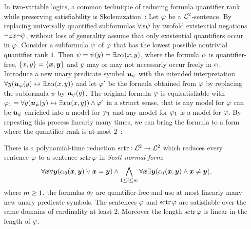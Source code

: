 In two-variable logics, a common technique of reducing formula quantifier rank
while preserving satisfiability is Skolemization~\cite{gradel1999logics}:
Let $\varphi$ be a $\mathcal{L}^{2}$-sentence.
By replacing universally quantified subformulas $\forall x \psi$ by twofold
existential negations $\lnot\exists x \lnot\psi$, without loss of generality
assume that only existential quantifiers occur in $\varphi$.
Consider a subformula $\psi$ of $\varphi$ that has the lowest possible nontrivial
quantifier rank $1$.
Then $\psi = \psi(y) = \exists x \alpha(x,y)$, where the formula
$\alpha$ is quantifier-free, $\left\{x,y\right\} = \left\{\bm{x},\bm{y}\right\}$ and $y$ may
or may not necessarly occur freely in $\alpha$.
Introduce a new unary predicate symbol $\bm{u}_{\psi}$ with the intended
interpretation $\forall y(\bm{u}_{\psi}(y) \leftrightarrow \exists x \alpha(x,y))$ and
let ${\varphi'}$ be the formula obtained from $\varphi$ by replacing the subformula
$\psi$ by $\bm{u}_{\psi}(y)$.
The original formula $\varphi$ is equisatisfiable with
$\varphi_1 = \forall y(\bm{u}_{\psi}(y) \leftrightarrow \exists x \alpha(x,y)) \land
{\varphi'}$ in a strinct sense, that is any model for $\varphi$ can be
$\bm{u}_{\psi}$-enriched into a model for $\varphi_1$ and any model for $\varphi_1$ is a
model for $\varphi$.
By repeating this process linearly many times, we can bring the formula to a
form where the quantifier rank is at most 
$2$~\cite{scott1962decision,gradel1999logics}:
\begin{theorem}[Scott]
There is a polynomial-time reduction $\operatorname{sctr}: \mathcal{L}^{2} \to \mathcal{L}^{2}$ which reduces
every sentence $\varphi$ to a sentence $\operatorname{sctr}\varphi$ in \emph{Scott normal form}:
\[
  \forall\bm{x}\forall\bm{y}(\alpha_{0}(\bm{x},\bm{y}) \lor \bm{x} = \bm{y}) \land
  \bigwedge_{1 \leq i \leq m} \forall\bm{x}\exists\bm{y}
  (\alpha_{i}(\bm{x},\bm{y}) \land \bm{x} \neq \bm{y}),
\]
where $m\geq1$, the formulas $\alpha_{i}$ are quantifier-free and use at most
linearly many new unary predicate symbols.
The sentences $\varphi$ and $\operatorname{sctr}\varphi$ are satisfiable over the same domains of
cardinality at least $2$.
Moreover the length $\operatorname{sctr}\varphi$ is linear in the length of $\varphi$.
\end{theorem}